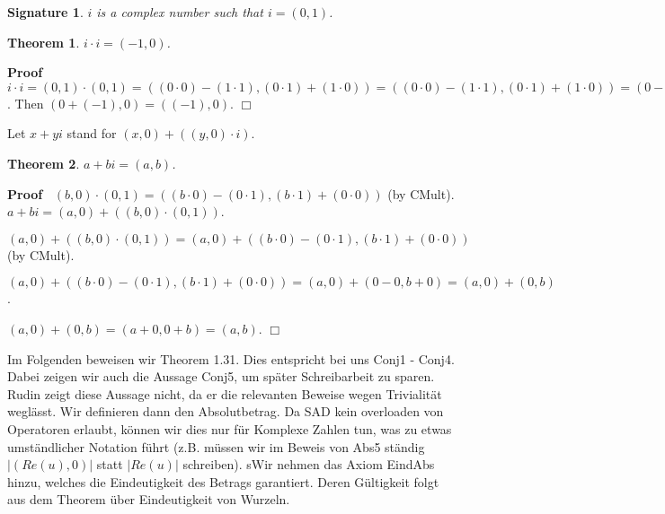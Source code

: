 \documentclass{article}
\newenvironment{forthel}{\begin{leftbar}}{\end{leftbar}}
\newenvironment{proof}{\noindent\textbf{Proof\ }}{\hspace*{\fill}$\Box$\medskip}
\newtheorem{theorem}{Theorem}
\newtheorem{signature}{Signature}
\newcommand{\cmul}{\cdot}
\newcommand{\cadd}{+}
\newcommand{\di }{i}
\begin{document}
\begin{forthel}
\begin{signature} $\di $ is a complex number such that $\di  = (0,1)$.

\end{signature}

\begin{theorem} $\di  \cmul \di  = (-1,0)$.
\end{theorem}\begin{proof}
  $\di  \cmul \di  = (0,1)  \cmul  (0,1) 
= ((0 \cdot 0) - (1 \cdot 1),( 0 \cdot 1) + (1 \cdot 0))
=((0 \cdot 0) - (1 \cdot 1),( 0 \cdot 1) + (1 \cdot 0)) 
= (0 - 1, 0+0) 
= (0+(-1),0)$.\newline
Then $(0+(-1),0) = ((-1),0)$. 
\end{proof}


Let $x+y\di $ stand for $(x,0)  \cadd  ((y,0) \cmul \di )$.


\begin{theorem} $a+b\di  = (a,b)$.
\end{theorem}\begin{proof}
$(b,0) \cmul (0,1) = ((b \cdot 0)-(0 \cdot 1) , (b \cdot 1)+(0 \cdot 0))$ (by CMult).\newline
$a+b\di  = (a,0)  \cadd  ((b,0) \cmul (0,1))$. \newline

$(a,0)  \cadd  ((b,0) \cmul (0,1))
= (a,0)  \cadd  ((b \cdot 0)-(0 \cdot 1) , (b \cdot 1)+(0 \cdot 0))$ (by CMult).\newline

$(a,0)  \cadd  ((b \cdot 0)-(0 \cdot 1) , (b \cdot 1)+(0 \cdot 0))
= (a,0)  \cadd  (0-0,b+0) 
= (a,0)  \cadd  (0,b)$.\newline

$(a,0) \cadd (0,b)
= (a+0,0+b) 
= (a,b)$.
\end{proof}

\end{forthel}
Im Folgenden beweisen wir Theorem 1.31. Dies entspricht bei uns Conj1 - Conj4. Dabei zeigen wir auch die Aussage Conj5, um später Schreibarbeit zu sparen. Rudin zeigt diese Aussage nicht, da er die relevanten Beweise wegen Trivialität weglässt. \newline
Wir definieren dann den Absolutbetrag. Da SAD kein overloaden von Operatoren erlaubt, können wir dies nur für Komplexe Zahlen tun, was zu etwas umständlicher Notation führt (z.B. müssen wir im Beweis von Abs5 ständig $|(Re(u),0)|$ statt $|Re(u)|$ schreiben).
sWir nehmen das Axiom EindAbs hinzu, welches die Eindeutigkeit des Betrags garantiert. Deren Gültigkeit folgt aus dem Theorem über Eindeutigkeit von Wurzeln.
\end{document}
